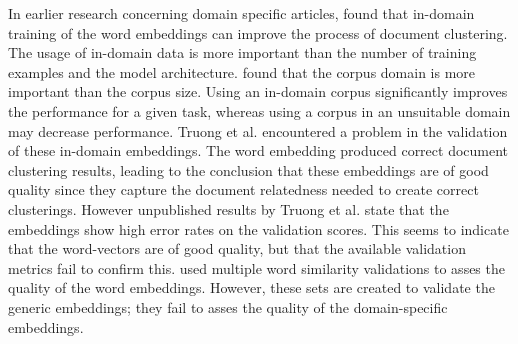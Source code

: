 \documentclass[../../Thesis.tex]{subfiles}
\begin{document}
In earlier research concerning domain specific articles,  \citet{Truong2017Thesis} found that in-domain training of the word embeddings can improve the process of document clustering. The usage of in-domain data is more important than the number of training examples and the model architecture. \citet{lai2016generate} found that the corpus domain is more important than the corpus size. Using an in-domain corpus significantly improves the performance for a given task, whereas using a corpus in an unsuitable domain may decrease performance.
Truong et al. encountered a problem in the validation of these in-domain embeddings. The word embedding produced correct document clustering results, leading to the conclusion that these embeddings are of good quality since they capture the document relatedness needed to create correct clusterings. However unpublished results by Truong et al. state that the embeddings show high error rates on the validation scores. This seems to indicate that the word-vectors are of good quality, but that the available validation metrics fail to confirm this. \citet{Truong2017Thesis} used multiple word similarity validations to asses the quality of the word embeddings. However, these sets are created to validate the generic embeddings; they fail to asses the quality of the domain-specific embeddings.
\end{document}
